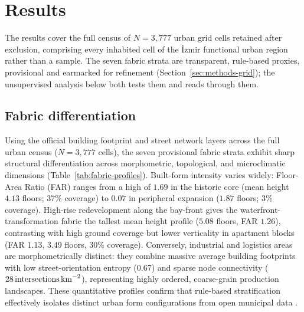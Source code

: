 \section{Results}
\label{sec:results}

The results cover the full census of $N=3{,}777$ urban grid cells retained after
exclusion, comprising every inhabited cell of the \.{I}zmir functional urban
region rather than a sample. The seven fabric strata are transparent, rule-based proxies,
provisional and earmarked for refinement (Section~\ref{sec:methods-grid}); the
unsupervised analysis below both tests them and reads through them.

\subsection{Fabric differentiation}
\label{sec:res-morpho}
Using the official building footprint and street network layers across the full urban census ($N=3{,}777$ cells), the seven provisional fabric strata exhibit sharp structural differentiation across morphometric, topological, and microclimatic dimensions (Table~\ref{tab:fabric-profiles}). Built-form intensity varies widely: Floor-Area Ratio (FAR) ranges from a high of $1.69$ in the historic core (mean height $4.13$ floors; $37\%$ coverage) to $0.07$ in peripheral expansion ($1.87$ floors; $3\%$ coverage). High-rise redevelopment along the bay-front gives the waterfront-transformation fabric the tallest mean height profile ($5.08$ floors, FAR $1.26$), contrasting with high ground coverage but lower verticality in apartment blocks (FAR $1.13$, $3.49$ floors, $30\%$ coverage). Conversely, industrial and logistics areas are morphometrically distinct: they combine massive average building footprints with low street-orientation entropy ($0.67$) and sparse node connectivity ($28\,\text{intersections\,km}^{-2}$), representing highly ordered, coarse-grain production landscapes. These quantitative profiles confirm that rule-based stratification effectively isolates distinct urban form configurations from open municipal data \citep{fleischmann2022MethodolFoundati, araldi2025MultiLevel}.

